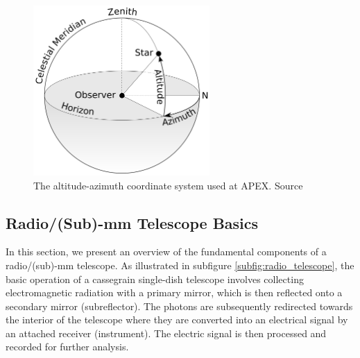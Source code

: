 


\begin{figure}[H]
    \centering
    \includegraphics[width=0.6\textwidth]{Astronomy/Azimuth-Altitude_schematic.png}
    \caption[Altitude-azimuth coordinate system]{The altitude-azimuth coordinate system used at APEX. Source \cite{altaz_schematic}}
    \label{fig:altaz_coords}
\end{figure}




\subsection{Radio/(Sub)-mm Telescope Basics}
In this section, we present an overview of the fundamental components of a radio/(sub)-mm telescope.
As illustrated in subfigure \ref{subfig:radio_telescope}, the basic operation of a cassegrain single-dish telescope involves collecting electromagnetic radiation with a primary mirror, which is then reflected onto a secondary mirror (subreflector).
The photons are subsequently redirected towards the interior of the telescope where they are converted into an electrical signal by an attached receiver (instrument).
The electric signal is then processed and recorded for further analysis.

